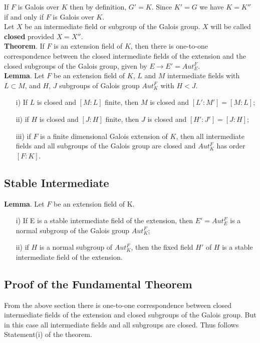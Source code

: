     If \(F\) is Galois over \(K\) then by definition, \(G'=K\). Since \(K'=G\) we have \(K=K''\) if and only if \(F\) is Galois over \(K\).\\

    Let \(X\) be an intermediate field or subgroup of the Galois group. \(X\) will be called \textbf{closed} provided \(X=X''\).\\[3mm]

    \textbf{Theorem}. If \(F\) is an extension field of \(K\), then there is one-to-one correspondence between the closed intermediate fields of the extension and the closed subgroups of the Galois group, given by \(E \rightarrow E' =  Aut_E^F\).\\[3mm]

    \textbf{Lemma}. Let \(F\) be an extension field of \(K\), \(L\) and \(M\) intermediate fields with \(L \subset M\), and \(H\), \(J\) subgroups of Galois group \(Aut_K^F\) with \(H<J\).
    \begin{enumerate}
    \item[i)] If \(L\) is closed and \([M:L]\) finite, then \(M\) is closed and \([L':M']=[M:L]\);
    \item[ii)] if \(H\) is closed and \([J:H]\) finite, then \(J\) is closed and \([H':J']=[J:H]\);
      \item[iii)] if \(F\) is a finite dimensional Galois extension of \(K\), then all intermediate fields and all subgroups of the Galois group are closed and \(Aut_K^F\) has order \([F:K]\).
      \end{enumerate}

      \subsection{Stable Intermediate}
      \textbf{Lemma}. Let \(F\) be an extension field of K.
      \begin{enumerate}
      \item[i)] If E is a stable intermediate field of the extension, then \(E'=Aut_E^F\) is a normal subgroup of the Galois group \(Aut_K^F\);
        \item[ii)] if \(H\) is a normal subgroup of \(Aut_K^F\), then the fixed field \(H'\) of \(H\) is a stable intermediate field of the extension.
        \end{enumerate}

        \subsection{Proof of the Fundamental Theorem}
        From the above section there is one-to-one correspondence between closed intermediate fields of the extension and closed subgroups of the Galois group. But in this case all intermediate fields and all subgroups are closed. Thus follows Statement(i) of the theorem.\\[2mm]

